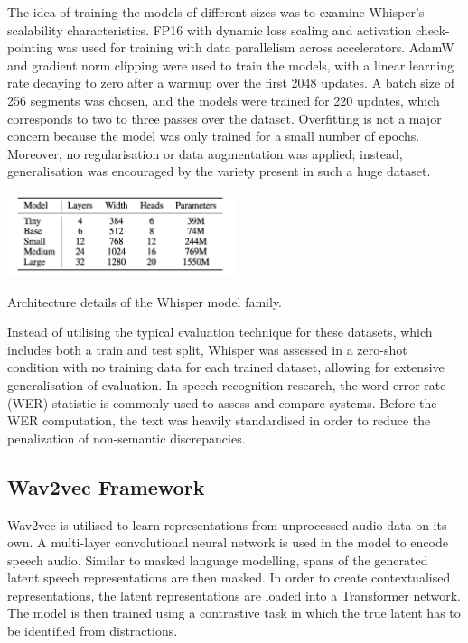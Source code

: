 \documentclass[conference]{IEEEtran}
\begin{document}
The idea of training the models of different sizes was to examine Whisper's scalability characteristics. FP16 with dynamic loss scaling and activation check-pointing was used for training with data parallelism across accelerators. AdamW and gradient norm clipping were used to train the models, with a linear learning rate decaying to zero after a warmup over the first 2048 updates. A batch size of 256 segments was chosen, and the models were trained for 220 updates, which corresponds to two to three passes over the dataset. Overfitting is not a major concern because the model was only trained for a small number of epochs. Moreover, no regularisation or data augmentation was applied; instead, generalisation was encouraged by the variety present in such a huge dataset.

\begin{table}[ht]
\centering
\includegraphics[width=0.5\textwidth]{2.png}
\caption{Architecture details of the Whisper model family.}
\label{fig:whisper_asr_architecture}
\end{table}

Instead of utilising the typical evaluation technique for these datasets, which includes both a train and test split, Whisper was assessed in a zero-shot condition with no training data for each trained dataset, allowing for extensive generalisation of evaluation. In speech recognition research, the word error rate (WER) statistic is commonly used to assess and compare systems. Before the WER computation, the text was heavily standardised in order to reduce the penalization of non-semantic discrepancies. \cite{radford2022}

\subsection{Wav2vec Framework}

\quad \quad Wav2vec is utilised to learn representations from unprocessed audio data on its own. A multi-layer convolutional neural network is used in the model to encode speech audio. Similar to masked language modelling, spans of the generated latent speech representations are then masked. In order to create contextualised representations, the latent representations are loaded into a Transformer network. The model is then trained using a contrastive task in which the true latent has to be identified from distractions.
\end{document}
